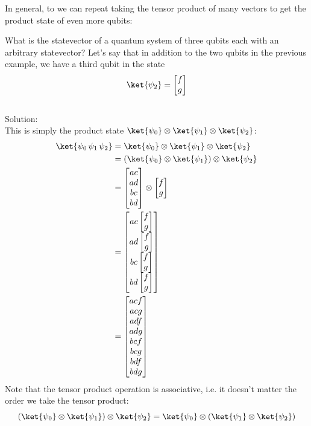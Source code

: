 \documentclass{article}
\newcommand{\soln}{{\\[1em] \hspace{-1em}\color{greentitle}\sffamily\large Solution: \\[0.5em]}}
\theoremstyle{definition}
\begin{document}
In general, to we can repeat taking the tensor product of many vectors to get the product state of even more qubits:
\begin{example}
	What is the statevector of a quantum system of three qubits each with an arbitrary statevector?
	Let's say that in addition to the two qubits in the previous example, we have a third qubit in the state
	\begin{equation}
		\ket{\psi_2} = \begin{bmatrix}f\\ g\end{bmatrix}
	\end{equation}
	\soln \textnormal{This is simply the product state $\ket{\psi_0} \otimes \ket{\psi_1} \otimes \ket{\psi_2}$:}
	\begin{align}
		\ket{\psi_0\,\psi_1\,\psi_2} &= \ket{\psi_0} \otimes \ket{\psi_1} \otimes \ket{\psi_2}\\
		&= (\ket{\psi_0} \otimes \ket{\psi_1}) \otimes \ket{\psi_2}\\
		&= \begin{bmatrix}ac\\ ad\\ bc\\ bd\end{bmatrix} \otimes \begin{bmatrix}f\\ g\end{bmatrix}\\
		&= \begin{bmatrix}ac\begin{bmatrix}f\\ g\end{bmatrix}\\ ad\begin{bmatrix}f\\ g\end{bmatrix}\\ bc\begin{bmatrix}f\\ g\end{bmatrix}\\ bd\begin{bmatrix}f\\ g\end{bmatrix}\end{bmatrix}\\
		&= \begin{bmatrix}acf\\ acg\\ adf\\ adg\\ bcf\\ bcg\\ bdf\\ bdg\end{bmatrix}
	\end{align}
	Note that the tensor product operation is associative, i.e. it doesn't matter the order we take the tensor product:
	\begin{equation}
		(\ket{\psi_0} \otimes \ket{\psi_1}) \otimes \ket{\psi_2} = \ket{\psi_0} \otimes (\ket{\psi_1} \otimes \ket{\psi_2})
	\end{equation}
\end{example}
\end{document}
